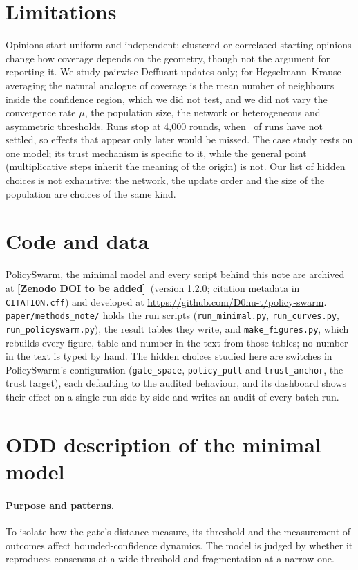 \documentclass[11pt]{article}
\newcommand{\ArchiveDOI}{\textbf{[Zenodo DOI to be added]}}
\begin{document}
\section{Limitations}
Opinions start uniform and independent; clustered or correlated starting opinions change how coverage depends on the geometry, though not the argument for reporting it.
We study pairwise Deffuant updates only; for Hegselmann--Krause averaging the natural analogue of coverage is the mean number of neighbours inside the confidence region, which we did not test, and we did not vary the convergence rate $\mu$, the population size, the network or heterogeneous and asymmetric thresholds.
Runs stop at 4{,}000 rounds, when \VUnsettledFourAll\ of runs have not settled, so effects that appear only later would be missed.
The case study rests on one model; its trust mechanism is specific to it, while the general point (multiplicative steps inherit the meaning of the origin) is not.
Our list of hidden choices is not exhaustive: the network, the update order and the size of the population are choices of the same kind.

\section*{Code and data}
PolicySwarm, the minimal model and every script behind this note are archived at \ArchiveDOI\ (version 1.2.0; citation metadata in \texttt{CITATION.cff}) and developed at \url{https://github.com/D0nu-t/policy-swarm}.
\texttt{paper/methods\_note/} holds the run scripts (\texttt{run\_minimal.py}, \texttt{run\_curves.py}, \texttt{run\_policyswarm.py}), the result tables they write, and \texttt{make\_figures.py}, which rebuilds every figure, table and number in the text from those tables; no number in the text is typed by hand.
The hidden choices studied here are switches in PolicySwarm's configuration (\texttt{gate\_space}, \texttt{policy\_pull} and \texttt{trust\_anchor}, the trust target), each defaulting to the audited behaviour, and its dashboard shows their effect on a single run side by side and writes an audit of every batch run.




\appendix
\section{ODD description of the minimal model}
\label{app:odd}
\paragraph{Purpose and patterns.} To isolate how the gate's distance measure, its threshold and the measurement of outcomes affect bounded-confidence dynamics. The model is judged by whether it reproduces consensus at a wide threshold and fragmentation at a narrow one.
\end{document}
